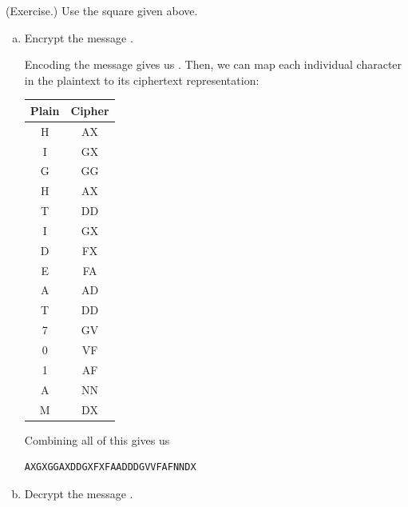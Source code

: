 \documentclass[letterpaper]{article}
\begin{document}
\begin{mdframed}
    (Exercise.) Use the square given above.
    \begin{enumerate}[(a)]
        \item Encrypt the message .
        \begin{mdframed}
            Encoding the message gives us . Then, we can map each individual character in the plaintext to its ciphertext representation:
            \begin{center}
                \begin{tabular}{c|c}
                    \textbf{Plain} & \textbf{Cipher} \\ 
                    \hline 
                    H              & AX \\
                    I              & GX \\
                    G              & GG \\
                    H              & AX \\
                    T              & DD \\
                    I              & GX \\
                    D              & FX \\
                    E              & FA \\
                    A              & AD \\
                    T              & DD \\
                    7              & GV \\
                    0              & VF \\
                    1              & AF \\
                    A              & NN \\
                    M              & DX 
                \end{tabular}
            \end{center}
            Combining all of this gives us 
            \begin{mdframed}
                \begin{verbatim}
AXGXGGAXDDGXFXFAADDDGVVFAFNNDX\end{verbatim}
            \end{mdframed}
        \end{mdframed}
        \item Decrypt the message .

\end{enumerate}
\end{mdframed}
\end{document}

